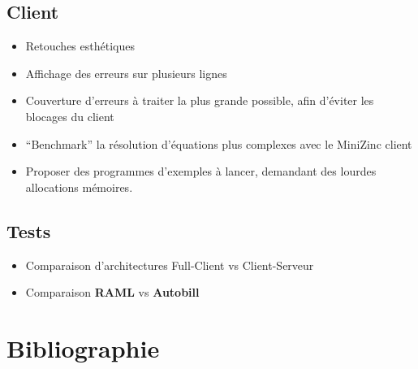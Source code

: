 \documentclass[
  12pt,
]{article}
\providecommand{\tightlist}{%
  \setlength{\itemsep}{0pt}\setlength{\parskip}{0pt}}
\begin{document}
\hypertarget{client}{%
\subsection{Client}\label{client}}

\begin{itemize}
\tightlist
\item
  Retouches esthétiques
\item
  Affichage des erreurs sur plusieurs lignes
\item
  Couverture d'erreurs à traiter la plus grande possible, afin d'éviter
  les blocages du client
\item
  ``Benchmark'' la résolution d'équations plus complexes avec le
  MiniZinc client
\item
  Proposer des programmes d'exemples à lancer, demandant des lourdes
  allocations mémoires.
\end{itemize}

\hypertarget{tests}{%
\subsection{Tests}\label{tests}}

\begin{itemize}
\tightlist
\item
  Comparaison d'architectures Full-Client vs Client-Serveur
\item
  Comparaison \textbf{RAML} vs \textbf{Autobill}
\end{itemize}

\hypertarget{biblio}{%
\section{Bibliographie}\label{biblio}}
\end{document}
